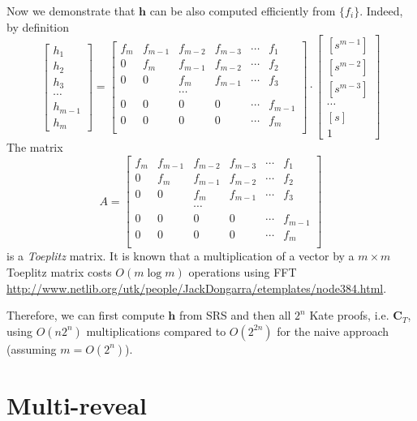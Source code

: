 \documentclass[a4paper]{article}
\begin{document}
Now we demonstrate that $\mathbf{h}$ can be also computed efficiently from $\{f_i\}$. Indeed, by definition
$$
\begin{bmatrix}
h_1\\
h_2\\
h_3\\
\cdots\\
h_{m-1}\\
h_m
\end{bmatrix}= \begin{bmatrix}
f_m &f_{m-1}&f_{m-2}&f_{m-3}&\cdots & f_1\\
0& f_m &f_{m-1}&f_{m-2}&\cdots & f_2\\
0 & 0& f_m &f_{m-1}&\cdots & f_3\\
&&\cdots&&&\\
0 & 0& 0 &0&\cdots & f_{m-1}\\
0 & 0& 0 &0&\cdots & f_m\\
\end{bmatrix}\cdot\begin{bmatrix}
[s^{m-1}]\\
[s^{m-2}]\\
[s^{m-3}]\\
\cdots\\
[s]\\
1
\end{bmatrix}
$$
The matrix 
$$
A = \begin{bmatrix}
f_m &f_{m-1}&f_{m-2}&f_{m-3}&\cdots & f_1\\
0& f_m &f_{m-1}&f_{m-2}&\cdots & f_2\\
0 & 0& f_m &f_{m-1}&\cdots & f_3\\
&&\cdots&&&\\
0 & 0& 0 &0&\cdots & f_{m-1}\\
0 & 0& 0 &0&\cdots & f_m\\
\end{bmatrix}
$$
is a \emph{Toeplitz} matrix. It is known that a multiplication of a vector by a $m\times m$ Toeplitz matrix costs $O(m\log m)$ operations using FFT \url{http://www.netlib.org/utk/people/JackDongarra/etemplates/node384.html}. 

Therefore, we can first compute $\mathbf{h}$ from SRS and then all  $2^n$ Kate proofs, i.e. $\mathbf{C}_T$, using $O(n2^n)$ multiplications compared to $O(2^{2n})$ for the naive approach (assuming $m = O(2^n)$).

\section{Multi-reveal}
\end{document}
